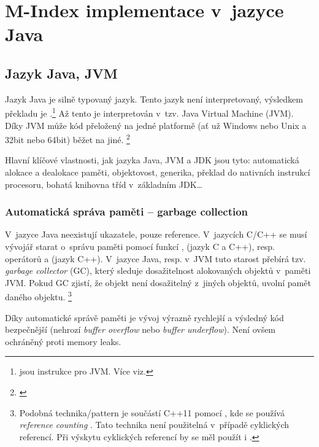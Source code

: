 \chapter{M-Index implementace v~jazyce Java}


\section{Jazyk Java, JVM}

Jazyk Java je silně typovaný jazyk. Tento jazyk není interpretovaný,
výsledkem překladu je \bytecode{}.\footnote{\bytecode{} jsou instrukce pro JVM. Více viz. } Až tento \bytecode{} je interpretován
v~tzv. Java Virtual Machine (JVM).
Díky JVM může kód přeložený na jedné platformě (ať už Windows nebo Unix a 32bit nebo 64bit) běžet na jiné. \footnote{\emph{}\cite{lindholm2013java}}

Hlavní klíčové vlastnosti, jak jazyka Java, JVM a JDK
jsou tyto: automatická alokace a dealokace paměti, objektovost, generika,
překlad \bytecode{} do nativních instrukcí procesoru, bohatá
knihovna tříd v~základním JDK\ldots{}


\subsection{Automatická správa paměti -- garbage collection}

V~jazyce Java neexistují ukazatele, pouze reference. V~jazycích C/C++
se musí vývojář starat o~správu paměti pomocí funkcí ,
 (jazyk C a C++), resp. operátorů  a 
(jazyk C++). V~jazyce Java, resp. v~JVM \cite{lindholm2013java} tuto starost přebírá tzv. \emph{garbage
collector} (GC), který sleduje
dosažitelnost alokovaných objektů v~paměti JVM. Pokud GC
zjistí, že objekt není dosažitelný z~jiných objektů, uvolní pamět daného objektu.
\footnote{Podobná technika/pattern je součástí C++11 pomocí ,
kde se používá \emph{reference counting} \cite{ISO:2012:CPP}. Tato technika není použitelná v~případě cyklických referencí. Při výskytu cyklických referencí by se měl použít i .
}

Díky automatické správě paměti je vývoj výrazně rychlejší a výsledný
kód bezpečnější (nehrozí \emph{buffer overflow} nebo \emph{buffer underflow}). Není ovšem ochráněný proti
memory leaks.

